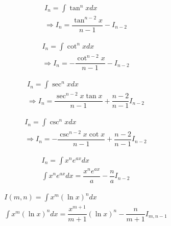 \begin{align}
	I_n=\int \tan^n x dx\nonumber\\
	\Rightarrow I_n=\dfrac{\tan^{n-2} x}{n-1}-I_{n-2}
\end{align}

\begin{align}
	I_n=\int \cot^n x dx\nonumber\\
	\Rightarrow I_n=-\dfrac{\cot^{n-2} x}{n-1}-I_{n-2}
\end{align}

\begin{align}
	I_n=\int \sec^n x dx\nonumber\\
	\Rightarrow I_n=\dfrac{\sec^{n-2}x\tan x}{n-1}+\dfrac{n-2}{n-1}I_{n-2}
\end{align}

\begin{align}
	I_n=\int \csc^n x dx\nonumber\\
	\Rightarrow I_n=-\dfrac{\csc^{n-2}x\cot x}{n-1}+\dfrac{n-2}{n-1}I_{n-2}
\end{align}

\begin{align}
	I_n=\int x^n e^{ax} dx\\
	\int x^n e^{ax} dx=\dfrac{x^n e^{ax}}{a}-\dfrac{n}{a}I_{n-2}
\end{align}

\begin{align}
	I(m,n)=\int x^m (\ln x)^n dx\\
	\int x^m (\ln x)^n dx=\dfrac{x^{m+1}}{m+1}(\ln x)^n-\dfrac{n}{m+1}I_{m,n-1}
\end{align}